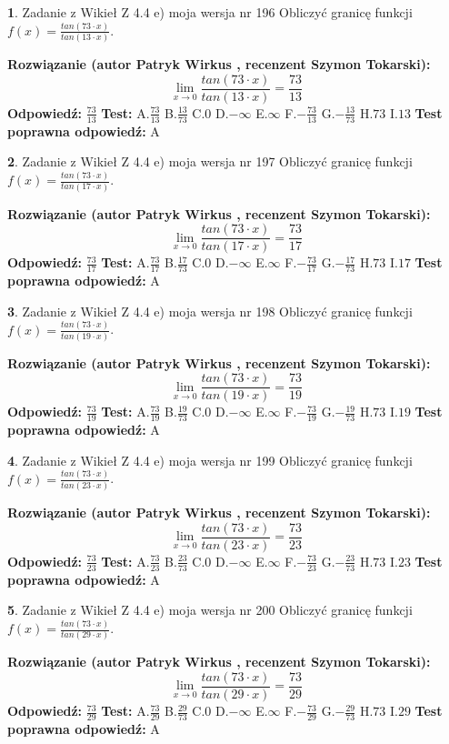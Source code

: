 \documentclass[12pt, a4paper]{article}
\theoremstyle{definition} %
\newtheorem{zad}{}
\newcommand{\zadStart}[1]{\begin{zad}#1\newline}
\newcommand{\zadStop}{\end{zad}}
\newcommand{\rozwStart}[2]{\noindent \textbf{Rozwiązanie (autor #1 , recenzent #2): }\newline}
\newcommand{\rozwStop}{\newline}
\newcommand{\odpStart}{\noindent \textbf{Odpowiedź:}\newline}
\newcommand{\odpStop}{\newline}
\newcommand{\testStart}{\noindent \textbf{Test:}\newline}
\newcommand{\testStop}{\newline}
\newcommand{\kluczStart}{\noindent \textbf{Test poprawna odpowiedź:}\newline}
\newcommand{\kluczStop}{\newline}
\begin{document}
\zadStart{Zadanie z Wikieł Z 4.4 e) moja wersja nr 196}
Obliczyć granicę funkcji $f(x)=\frac{tan(73\cdot x)}{tan(13\cdot x)}$.
\zadStop
\rozwStart{Patryk Wirkus}{Szymon Tokarski}
$$\lim\limits_{x\to 0}\frac{tan(73\cdot x)}{tan(13\cdot x)}=
\frac{73}{13}$$
\rozwStop
\odpStart
$\frac{73}{13}$
\odpStop
\testStart
A.$\frac{73}{13}$
B.$\frac{13}{73}$
C.$0$
D.$-\infty$
E.$\infty$
F.$-\frac{73}{13}$
G.$-\frac{13}{73}$
H.$73$
I.$13$
\testStop
\kluczStart
A
\kluczStop



\zadStart{Zadanie z Wikieł Z 4.4 e) moja wersja nr 197}
Obliczyć granicę funkcji $f(x)=\frac{tan(73\cdot x)}{tan(17\cdot x)}$.
\zadStop
\rozwStart{Patryk Wirkus}{Szymon Tokarski}
$$\lim\limits_{x\to 0}\frac{tan(73\cdot x)}{tan(17\cdot x)}=
\frac{73}{17}$$
\rozwStop
\odpStart
$\frac{73}{17}$
\odpStop
\testStart
A.$\frac{73}{17}$
B.$\frac{17}{73}$
C.$0$
D.$-\infty$
E.$\infty$
F.$-\frac{73}{17}$
G.$-\frac{17}{73}$
H.$73$
I.$17$
\testStop
\kluczStart
A
\kluczStop



\zadStart{Zadanie z Wikieł Z 4.4 e) moja wersja nr 198}
Obliczyć granicę funkcji $f(x)=\frac{tan(73\cdot x)}{tan(19\cdot x)}$.
\zadStop
\rozwStart{Patryk Wirkus}{Szymon Tokarski}
$$\lim\limits_{x\to 0}\frac{tan(73\cdot x)}{tan(19\cdot x)}=
\frac{73}{19}$$
\rozwStop
\odpStart
$\frac{73}{19}$
\odpStop
\testStart
A.$\frac{73}{19}$
B.$\frac{19}{73}$
C.$0$
D.$-\infty$
E.$\infty$
F.$-\frac{73}{19}$
G.$-\frac{19}{73}$
H.$73$
I.$19$
\testStop
\kluczStart
A
\kluczStop



\zadStart{Zadanie z Wikieł Z 4.4 e) moja wersja nr 199}
Obliczyć granicę funkcji $f(x)=\frac{tan(73\cdot x)}{tan(23\cdot x)}$.
\zadStop
\rozwStart{Patryk Wirkus}{Szymon Tokarski}
$$\lim\limits_{x\to 0}\frac{tan(73\cdot x)}{tan(23\cdot x)}=
\frac{73}{23}$$
\rozwStop
\odpStart
$\frac{73}{23}$
\odpStop
\testStart
A.$\frac{73}{23}$
B.$\frac{23}{73}$
C.$0$
D.$-\infty$
E.$\infty$
F.$-\frac{73}{23}$
G.$-\frac{23}{73}$
H.$73$
I.$23$
\testStop
\kluczStart
A
\kluczStop



\zadStart{Zadanie z Wikieł Z 4.4 e) moja wersja nr 200}
Obliczyć granicę funkcji $f(x)=\frac{tan(73\cdot x)}{tan(29\cdot x)}$.
\zadStop
\rozwStart{Patryk Wirkus}{Szymon Tokarski}
$$\lim\limits_{x\to 0}\frac{tan(73\cdot x)}{tan(29\cdot x)}=
\frac{73}{29}$$
\rozwStop
\odpStart
$\frac{73}{29}$
\odpStop
\testStart
A.$\frac{73}{29}$
B.$\frac{29}{73}$
C.$0$
D.$-\infty$
E.$\infty$
F.$-\frac{73}{29}$
G.$-\frac{29}{73}$
H.$73$
I.$29$
\testStop
\kluczStart
A
\kluczStop
\end{document}

